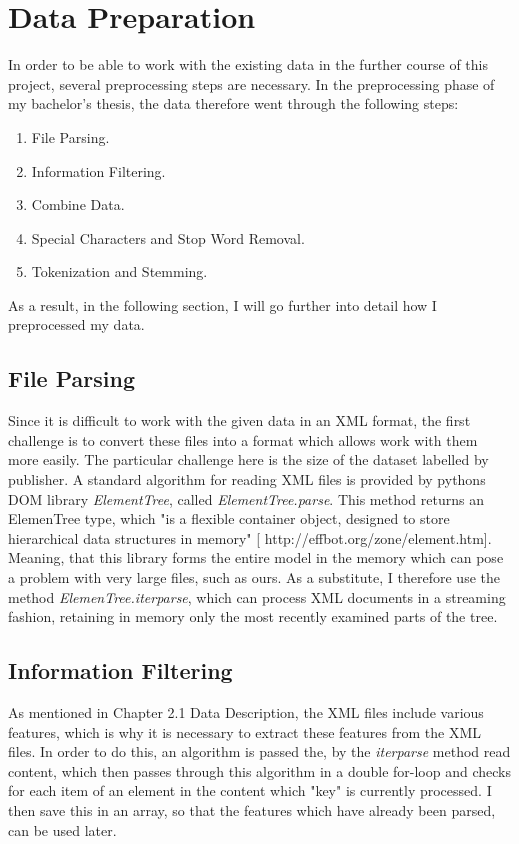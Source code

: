 \documentclass[a4paper, 11pt,titlepage,oneside,openany]{book}
\begin{document}
\section{Data Preparation}
In order to be able to work with the existing data in the further course of this project, several preprocessing steps are necessary. In the preprocessing phase of my bachelor's thesis, the data therefore went through the following steps:
\begin{enumerate}
	\item File Parsing. 
	\item Information Filtering.
	\item Combine Data.
	\item Special Characters and Stop Word Removal.
	\item Tokenization and Stemming.
\end{enumerate}	
\noindent As a result, in the following section, I will go further into detail how I preprocessed my data.

\newpage
\subsection{File Parsing}
Since it is difficult to work with the given data in an XML format, the first challenge is to convert these files into a format which allows work with them more easily. The particular challenge here is the size of the dataset labelled by publisher. A standard algorithm for reading XML files is provided by pythons DOM library \textit{ElementTree}, called \textit{ElementTree.parse}\cite{parse}. This method returns an ElemenTree type, which "is a flexible container object, designed to store hierarchical data structures in memory" [ http://effbot.org/zone/element.htm]. Meaning, that this library forms the entire model in the memory which can pose a problem with very large files, such as ours. As a substitute, I therefore use the method \textit{ElemenTree.iterparse}, which can process XML documents in a streaming fashion, retaining in memory only the most recently examined parts of the tree\cite{iterparse}. 


\subsection{Information Filtering}
As mentioned in Chapter 2.1 Data Description, the XML files include various features, which is why it is necessary to extract these features from the XML files. In order to do this,  an algorithm  is passed the, by the \textit{iterparse} method read content, which then passes through this algorithm in a double for-loop and checks for each item of an element in the content which "key" is currently processed. I then save this in an array, so that the features which have already been parsed, can be used later. \\
\end{document}
